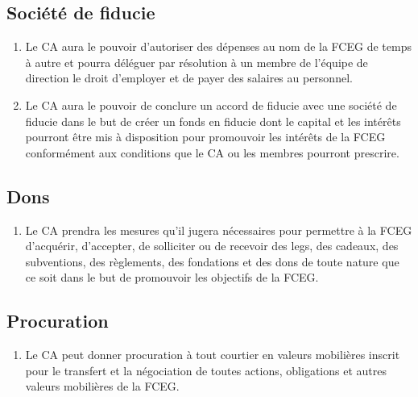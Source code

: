\subsection{Société de fiducie}
\label{dispositions-financieres-et-legales-societe-de-fiducie}

\begin{enumerate}
 \item Le CA aura le pouvoir d'autoriser des dépenses au nom de la FCEG de temps à autre et pourra déléguer par résolution à un membre de l'équipe de direction le droit d'employer et de payer des salaires au personnel.
 \item Le CA aura le pouvoir de conclure un accord de fiducie avec une société de fiducie dans le but de créer un fonds en fiducie dont le capital et les intérêts pourront être mis à disposition pour promouvoir les intérêts de la FCEG conformément aux conditions que le CA ou les membres pourront prescrire.
\end{enumerate}

\subsection{Dons}
\label{dispositions-financieres-et-legales-dons}

\begin{enumerate}
 \item Le CA prendra les mesures qu'il jugera nécessaires pour permettre à la FCEG d'acquérir, d'accepter, de solliciter ou de recevoir des legs, des cadeaux, des subventions, des règlements, des fondations et des dons de toute nature que ce soit dans le but de promouvoir les objectifs de la FCEG.
\end{enumerate}

\subsection{Procuration}
\label{dispositions-financieres-et-legales-procuration}

\begin{enumerate}
 \item Le CA peut donner procuration à tout courtier en valeurs mobilières inscrit pour le transfert et la négociation de toutes actions, obligations et autres valeurs mobilières de la FCEG.
\end{enumerate}
